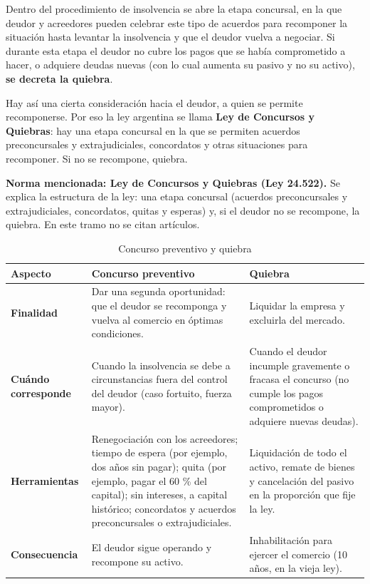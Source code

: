 \documentclass[12pt,oneside]{book}
\begin{document}
Dentro del procedimiento de insolvencia se abre la etapa concursal, en la que deudor y acreedores pueden celebrar este tipo de acuerdos para recomponer la situación hasta levantar la insolvencia y que el deudor vuelva a negociar. Si durante esta etapa el deudor no cubre los pagos que se había comprometido a hacer, o adquiere deudas nuevas (con lo cual aumenta su pasivo y no su activo), \textbf{se decreta la quiebra}.

Hay así una cierta consideración hacia el deudor, a quien se permite recomponerse. Por eso la ley argentina se llama \textbf{Ley de Concursos y Quiebras}: hay una etapa concursal en la que se permiten acuerdos preconcursales y extrajudiciales, concordatos y otras situaciones para recomponer. Si no se recompone, quiebra.

\begin{note}
\textbf{Norma mencionada: Ley de Concursos y Quiebras (Ley 24.522).} Se explica la estructura de la ley: una etapa concursal (acuerdos preconcursales y extrajudiciales, concordatos, quitas y esperas) y, si el deudor no se recompone, la quiebra. En este tramo no se citan artículos.
\end{note}

\begin{table}[H]
\centering
\caption{Concurso preventivo y quiebra}
\begin{tabularx}{\textwidth}{>{\raggedright\arraybackslash}p{} >{\raggedright\arraybackslash}X >{\raggedright\arraybackslash}X}
\toprule
\textbf{Aspecto} & \textbf{Concurso preventivo} & \textbf{Quiebra} \\
\midrule
\textbf{Finalidad} & Dar una segunda oportunidad: que el deudor se recomponga y vuelva al comercio en óptimas condiciones. & Liquidar la empresa y excluirla del mercado. \\
\textbf{Cuándo corresponde} & Cuando la insolvencia se debe a circunstancias fuera del control del deudor (caso fortuito, fuerza mayor). & Cuando el deudor incumple gravemente o fracasa el concurso (no cumple los pagos comprometidos o adquiere nuevas deudas). \\
\textbf{Herramientas} & Renegociación con los acreedores; tiempo de espera (por ejemplo, dos años sin pagar); quita (por ejemplo, pagar el 60 \% del capital); sin intereses, a capital histórico; concordatos y acuerdos preconcursales o extrajudiciales. & Liquidación de todo el activo, remate de bienes y cancelación del pasivo en la proporción que fije la ley. \\
\textbf{Consecuencia} & El deudor sigue operando y recompone su activo. & Inhabilitación para ejercer el comercio (10 años, en la vieja ley). \\
\bottomrule
\end{tabularx}
\end{table}
\end{document}
